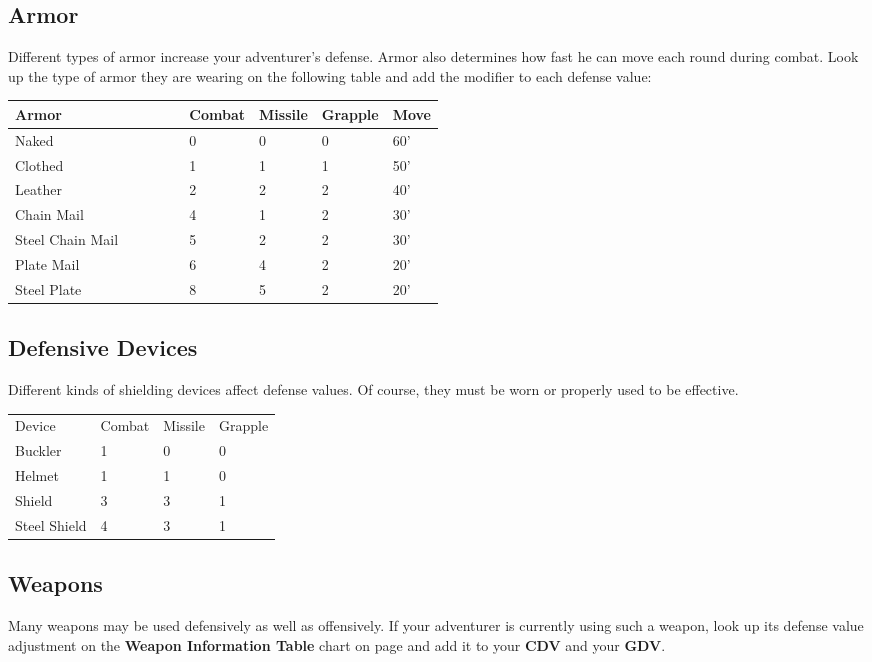 \begin{multicols*}{2}
\subsection{Armor}
Different types of armor increase your adventurer's defense. Armor also determines how fast he can move each round during combat. Look up the type of armor they are wearing on the following table and add the modifier to each defense value:
\begin{tcolorbox}[breakable,boxrule=0pt,title=\textbf{Armor Defense and Movement}]
\begin{tabular}{@{}l p{0.125\linewidth} p{0.125\linewidth} p{0.125\linewidth} p{0.125\linewidth}}
\small
\textbf{Armor} & \textbf{Combat} & \textbf{Missile} & \textbf{Grapple} & \textbf{Move}\\
\midrule
Naked & 0 & 0 & 0 & 60'\\
Clothed & 1 & 1 & 1 & 50'\\
Leather & 2 & 2 & 2 & 40'\\
Chain Mail & 4 & 1 & 2 & 30'\\
Steel Chain Mail  & 5 & 2 & 2 & 30'\\
Plate Mail & 6 & 4 & 2 & 20'\\
Steel Plate & 8 & 5 & 2 & 20'\\
\end{tabular}
\end{tcolorbox}
\subsection{Defensive Devices}
Different kinds of shielding devices affect defense values. Of course, they must be worn or properly used to be effective.
\begin{tcolorbox}[breakable,boxrule=0pt,title=\textbf{Device Defensive Additions}]
\begin{tabular}{l l l l}
Device & Combat & Missile & Grapple\\
Buckler & 1 & 0 & 0\\
Helmet & 1 & 1 & 0\\
Shield & 3 & 3 & 1\\
Steel Shield & 4 & 3 & 1\\
\end{tabular}
\end{tcolorbox}
\subsection{Weapons}
Many weapons may be used defensively as well as offensively. If your adventurer is currently using such a weapon, look up its defense value adjustment on the \textbf{Weapon Information Table} chart on page \pageref{playing-weapon-table} and add it to your \textbf{CDV} and your \textbf{GDV}.
\end{multicols*}